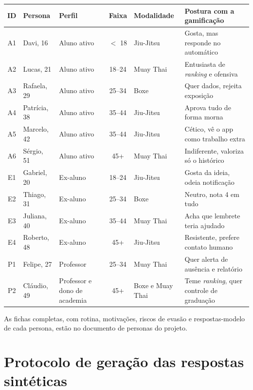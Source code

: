 \begin{apendicesenv}
\begin{quadro}[!htb]
  \caption{Mapa das personas sintéticas}
  \label{qua:mapa-personas}
  \centering
  \footnotesize
  \begin{tabular}{|c|p{2.3cm}|p{2.6cm}|c|p{1.9cm}|p{3.4cm}|}
    \hline
    \textbf{ID} & \textbf{Persona} & \textbf{Perfil} & \textbf{Faixa} & \textbf{Modalidade} & \textbf{Postura com a gamificação} \\ \hline
    A1 & Davi, 16 & Aluno ativo & $<$ 18 & Jiu-Jitsu & Gosta, mas responde no automático \\ \hline
    A2 & Lucas, 21 & Aluno ativo & 18--24 & Muay Thai & Entusiasta de \textit{ranking} e ofensiva \\ \hline
    A3 & Rafaela, 29 & Aluno ativo & 25--34 & Boxe & Quer dados, rejeita exposição \\ \hline
    A4 & Patrícia, 38 & Aluno ativo & 35--44 & Jiu-Jitsu & Aprova tudo de forma morna \\ \hline
    A5 & Marcelo, 42 & Aluno ativo & 35--44 & Jiu-Jitsu & Cético, vê o app como trabalho extra \\ \hline
    A6 & Sérgio, 51 & Aluno ativo & 45+ & Muay Thai & Indiferente, valoriza só o histórico \\ \hline
    E1 & Gabriel, 20 & Ex-aluno & 18--24 & Jiu-Jitsu & Gosta da ideia, odeia notificação \\ \hline
    E2 & Thiago, 31 & Ex-aluno & 25--34 & Boxe & Neutro, nota 4 em tudo \\ \hline
    E3 & Juliana, 40 & Ex-aluno & 35--44 & Muay Thai & Acha que lembrete teria ajudado \\ \hline
    E4 & Roberto, 48 & Ex-aluno & 45+ & Jiu-Jitsu & Resistente, prefere contato humano \\ \hline
    P1 & Felipe, 27 & Professor & 25--34 & Muay Thai & Quer alerta de ausência e relatório \\ \hline
    P2 & Cláudio, 49 & Professor e dono de academia & 45+ & Boxe e Muay Thai & Teme \textit{ranking}, quer controle de graduação \\ \hline
  \end{tabular}
\end{quadro}

As fichas completas, com rotina, motivações, riscos de evasão e
respostas-modelo de cada persona, estão no documento de personas do
projeto.

\chapter{Protocolo de geração das respostas sintéticas}
\label{ap:prompt}


\end{apendicesenv}
